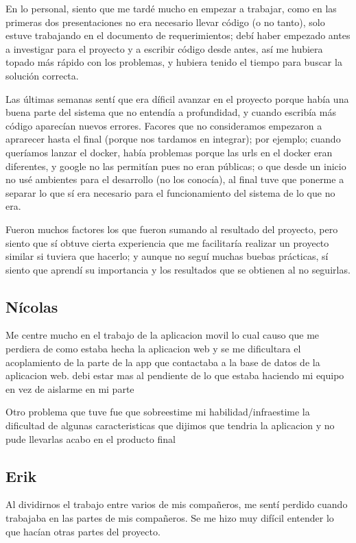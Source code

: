 \documentclass[12pt]{article}
\newcounter{ni}
\begin{document}
En lo personal, siento que me tardé mucho en empezar a trabajar, como en las primeras dos presentaciones no era necesario llevar código (o no tanto), solo estuve trabajando en el documento de requerimientos; debí haber empezado antes a investigar para el proyecto y a escribir código desde antes, así me hubiera topado más rápido con los problemas, y hubiera tenido el tiempo para buscar la solución correcta.

Las últimas semanas sentí que era díficil avanzar en el proyecto porque había una buena parte del sistema que no entendía a profundidad, y cuando escribía más código aparecían nuevos errores. Facores que no consideramos empezaron a aprarecer hasta el final (porque nos tardamos en integrar); por ejemplo; cuando queríamos lanzar el docker, había problemas porque las urls en el docker eran diferentes, y google no las permitían pues no eran públicas; o que desde un inicio no usé ambientes para el desarrollo (no los conocía), al final tuve que ponerme a separar lo que sí era necesario para el funcionamiento del sistema de lo que no era.

Fueron muchos factores los que fueron sumando al resultado del proyecto, pero siento que sí obtuve cierta experiencia que me facilitaría realizar un proyecto similar si tuviera que hacerlo; y aunque no seguí muchas buebas prácticas, sí siento que aprendí su importancia y los resultados que se obtienen al no seguirlas.

\subsection{Nícolas}
Me centre mucho en el trabajo de la aplicacion movil lo cual causo que me perdiera de como estaba hecha la aplicacion web y se me dificultara el acoplamiento de la parte de la app que contactaba a la base de datos de la aplicacion web. debi estar mas al pendiente de lo que estaba haciendo mi equipo en vez de aislarme en mi parte

Otro problema que tuve fue que sobreestime mi habilidad/infraestime la dificultad de algunas caracteristicas que dijimos que tendria la aplicacion y no pude llevarlas acabo en el producto final
\subsection{Erik}
Al dividirnos el trabajo entre varios de mis compañeros, me sentí perdido cuando trabajaba en las partes de mis compañeros. Se me hizo muy difícil entender lo que hacían otras partes del proyecto.
\end{document}
